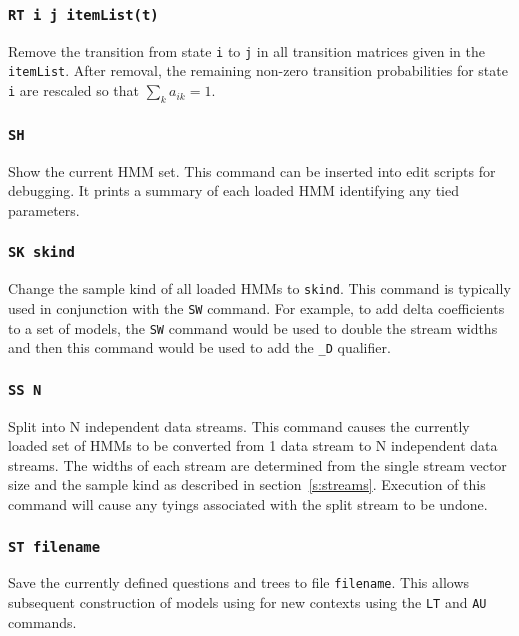 \subsubsection*{\tt RT i j itemList(t)}

Remove the transition from state \texttt{i} to \texttt{j} in all transition
matrices given in the \texttt{itemList}.  After removal, the remaining
non-zero transition probabilities for  state \texttt{i} 
are rescaled so that $\sum_k a_{ik} = 1 $.

\subsubsection*{\tt SH}

Show the current HMM set.  This command can be inserted into
edit scripts for debugging.  It prints a summary of each
loaded HMM identifying any tied parameters.

\subsubsection*{\tt SK skind}

Change the sample kind of all loaded HMMs to \texttt{skind}.  This
command is typically used in conjunction with the \texttt{SW} command.
For example, to add delta coefficients to a set of models, the \texttt{SW}
command would be used to double the stream widths and then this
command would be used to add the \texttt{\_D} qualifier.

\subsubsection*{\tt SS N}

Split into N independent data streams.
This command causes the currently loaded set of HMMs to be converted
from 1 data stream to N independent data streams.  The widths of 
each stream are determined from the single stream vector size and
the sample kind as described in section~\ref{s:streams}.
Execution of this command will cause
any tyings associated with the split stream to
be undone.

\subsubsection*{\tt ST filename}

Save the currently defined questions and trees to file \texttt{filename}.
This allows subsequent construction of models using for new contexts
using the \texttt{LT} and \texttt{AU} commands.

